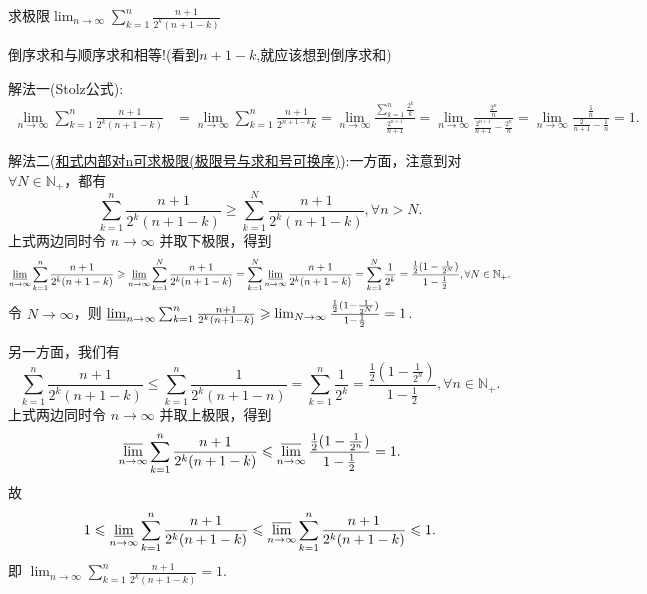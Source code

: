\documentclass[lang=cn,newtx,10pt,scheme=chinese]{elegantbook}
\begin{document}
\begin{example}
求极限\(\lim_{n\rightarrow\infty}\sum_{k = 1}^{n}\frac{n + 1}{2^k(n + 1 - k)}\)
\end{example}
\begin{note}
倒序求和与顺序求和相等!(看到$n+1-k$,就应该想到倒序求和)
\end{note}
\begin{solution}
{\color{blue}解法一(Stolz公式):}
\begin{align*}
\lim_{n\rightarrow\infty}\sum_{k = 1}^{n}\frac{n + 1}{2^k(n + 1 - k)}&=\lim_{n\rightarrow\infty}\sum_{k = 1}^{n}\frac{n + 1}{2^{n + 1 - k}k}=\lim_{n\rightarrow\infty}\frac{\sum\limits_{k = 1}^{n}\frac{2^k}{k}}{\frac{2^{n + 1}}{n + 1}}=\lim_{n\rightarrow\infty}\frac{\frac{2^n}{n}}{\frac{2^{n + 1}}{n + 1}-\frac{2^n}{n}}=\lim_{n\rightarrow\infty}\frac{\frac{1}{n}}{\frac{2}{n + 1}-\frac{1}{n}} = 1.
\end{align*}

{\color{blue}解法二(\hyperref[section:和式内部对n可求极限(极限号与求和号可换序)]{和式内部对n可求极限(极限号与求和号可换序)}):}一方面，注意到对 \(\forall N\in \mathbb{N}_+\)，都有
\[
\sum_{k = 1}^n\frac{n + 1}{2^k(n + 1 - k)}\geqslant \sum_{k = 1}^N\frac{n + 1}{2^k(n + 1 - k)},\forall n > N.
\]
上式两边同时令 \(n\rightarrow \infty\) 并取下极限，得到
\begin{align*}
\varliminf_{n\rightarrow \infty}\sum_{k = 1}^n\frac{n + 1}{2^k(n + 1 - k)}\geqslant \varliminf_{n\rightarrow \infty}\sum_{k = 1}^N\frac{n + 1}{2^k(n + 1 - k)}
=\sum_{k = 1}^N\varliminf_{n\rightarrow \infty}\frac{n + 1}{2^k(n + 1 - k)}
=\sum_{k = 1}^N\frac{1}{2^k}
=\frac{\frac{1}{2}(1 - \frac{1}{2^N})}{1 - \frac{1}{2}},\forall N\in \mathbb{N}_+.
\end{align*}
令 \(N\rightarrow \infty\)，则 \(\varliminf_{n\rightarrow \infty}\sum_{k = 1}^n\frac{n + 1}{2^k(n + 1 - k)}\geqslant \lim_{N\rightarrow \infty}\frac{\frac{1}{2}(1 - \frac{1}{2^N})}{1 - \frac{1}{2}} = 1\).

另一方面，我们有
\[
\sum_{k = 1}^n\frac{n + 1}{2^k(n + 1 - k)}\leqslant \sum_{k = 1}^n\frac{1}{2^k(n + 1 - n)}=\sum_{k = 1}^n\frac{1}{2^k}=\frac{\frac{1}{2}(1 - \frac{1}{2^n})}{1 - \frac{1}{2}},\forall n\in \mathbb{N}_+.
\]
上式两边同时令 \(n\rightarrow \infty\) 并取上极限，得到
\[
\varlimsup_{n\rightarrow \infty}\sum_{k = 1}^n\frac{n + 1}{2^k(n + 1 - k)}\leqslant \varlimsup_{n\rightarrow \infty}\frac{\frac{1}{2}(1 - \frac{1}{2^n})}{1 - \frac{1}{2}} = 1.
\]
故
\[
1\leqslant \varliminf_{n\rightarrow \infty}\sum_{k = 1}^n\frac{n + 1}{2^k(n + 1 - k)}\leqslant \varlimsup_{n\rightarrow \infty}\sum_{k = 1}^n\frac{n + 1}{2^k(n + 1 - k)}\leqslant 1.
\]
即 \(\lim_{n\rightarrow \infty}\sum_{k = 1}^n\frac{n + 1}{2^k(n + 1 - k)} = 1\).
\end{solution}
\end{document}

